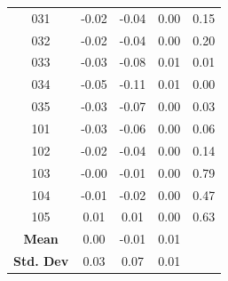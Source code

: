 \documentclass[12pt]{article}
\begin{document}
\begin{table}[p!]
\begin{tabular}{c | c c c c}
	031 &  -0.02 &    -0.04 &       0.00 &     0.15 \\
	032 &  -0.02 &    -0.04 &       0.00 &     0.20 \\
	033 &  -0.03 &    -0.08 &       0.01 &     0.01 \\
	034 &  -0.05 &    -0.11 &       0.01 &     0.00 \\
	035 &  -0.03 &    -0.07 &       0.00 &     0.03 \\
	101 &  -0.03 &    -0.06 &       0.00 &     0.06 \\
	102 &  -0.02 &    -0.04 &       0.00 &     0.14 \\
	103 &  -0.00 &    -0.01 &       0.00 &     0.79 \\
	104 &  -0.01 &    -0.02 &       0.00 &     0.47 \\
	105 &   0.01 &     0.01 &       0.00 &     0.63 \\
	\bottomrule
	\textbf{Mean} & 0.00 & -0.01 & 0.01 & \\
	\textbf{Std. Dev} & 0.03 & 0.07 & 0.01 & \\
\end{tabular}
	\label{tab:bencs:enso}
\end{table}
\end{document}
